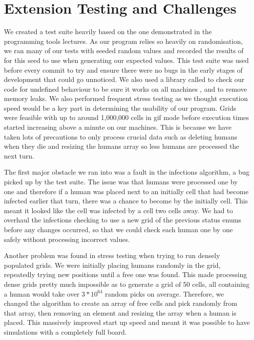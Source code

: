 \documentclass[11pt]{article}
\begin{document}
\section{Extension Testing and Challenges}
 We created a test suite heavily based on the one demonstrated in the programming tools lectures. 
 As our program relies so heavily on randomisation, we ran many of our tests with seeded random values and recorded the results of  for this seed to use when generating our expected values. 
 This test suite was used before every commit to try and ensure there were no bugs in the early stages of development that could go unnoticed. 
 We also used a library called  to check our code for undefined behaviour to be sure it works on all machines \cite{ubsan}, and   to remove memory leaks. 
 We also performed frequent stress testing as we thought execution speed would be a key part in determining the usability of our program. Grids were feasible with up to around 1,000,000 cells in gif mode before execution times started increasing above a minute on our machines. 
 This is because we have taken lots of precautions to only process crucial data such as deleting humans when they die and resizing the humans array so less humans are processed the next turn.
 
\par The first major obstacle we ran into was a fault in the infections algorithm, a bug picked up by the test suite. 
The issue was that humans were processed one by one and therefore if a human was placed next to an initially  cell that had become infected earlier that turn, there was a chance to become  by the initially  cell. 
This meant it looked like the cell was infected by a  cell two cells away. We had to overhaul the infections checking to use a new grid of the previous status enums before any changes occurred, so that we could check each human one by one safely without processing incorrect values. 

\par Another problem was found in stress testing when trying to run densely populated grids.
We were initially placing humans randomly in the grid, repeatedly trying new positions until a free one was found.
This made processing dense grids pretty much impossible as to generate a grid of 50 cells, all containing a human would take over $3 * 10^{64}$ random picks on average.
Therefore, we changed the algorithm to create an array of free cells and pick randomly from that array, then removing an element and resizing the array when a human is placed.
This massively improved start up speed and meant it was possible to have simulations with a completely full board.
\end{document}
